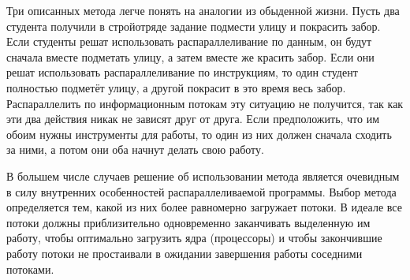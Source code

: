 Три описанных метода легче понять на аналогии из обыденной жизни.
Пусть два студента получили в стройотряде задание подмести улицу и покрасить забор.
Если студенты решат использовать распараллеливание по данным, он будут сначала вместе подметать улицу, а затем вместе же красить забор.
Если они решат использовать распараллеливание по инструкциям, то один студент полностью подметёт улицу, а другой покрасит в это время весь забор.
Распараллелить по информационным потокам эту ситуацию не получится, так как эти два действия никак не зависят друг от друга.
Если предположить, что им обоим нужны инструменты для работы, то один из них должен сначала сходить за ними, а потом они оба начнут делать свою работу.

В большем числе случаев решение об использовании метода является очевидным в силу внутренних особенностей распараллеливаемой программы.
Выбор метода определяется тем, какой из них более равномерно загружает потоки.
В идеале все потоки должны приблизительно одновременно заканчивать выделенную им работу, чтобы оптимально загрузить ядра (процессоры) и чтобы закончившие работу потоки не простаивали в ожидании завершения работы соседними потоками.
